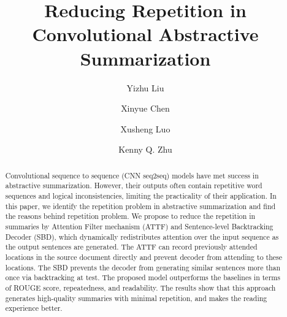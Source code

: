 \documentclass{nle}
\theoremstyle{definition}
\begin{document}
\label{firstpage}




\title{Reducing Repetition in Convolutional Abstractive Summarization}

\begin{authgrp}
\author{Yizhu Liu}
\author{Xinyue Chen}
\author{Xusheng Luo}
\author{ Kenny Q. Zhu}
\end{authgrp}


\begin{abstract}
Convolutional sequence to sequence (CNN seq2seq) models have met success in abstractive summarization. However, their outputs often contain repetitive word sequences and logical inconsistencies,
limiting the practicality of their application. 
In this paper, we identify the repetition problem in abstractive summarization and find the reasons behind repetition problem.
We propose to reduce the repetition in summaries by 
Attention Filter mechanism (ATTF) and Sentence-level Backtracking Decoder (SBD),
which dynamically redistributes attention over the input sequence 
as the output sentences are generated. 
The ATTF can record previously attended locations in the source document directly and prevent decoder from attending to these locations. The SBD prevents the decoder from generating similar sentences more than once via backtracking at test.
The proposed model outperforms the baselines 
in terms of ROUGE score, repeatedness, and readability. 
The results show that this approach 
generates high-quality summaries with minimal repetition,
and makes the reading experience better.
\end{abstract}

\maketitle








\label{lastpage}
\end{document}
